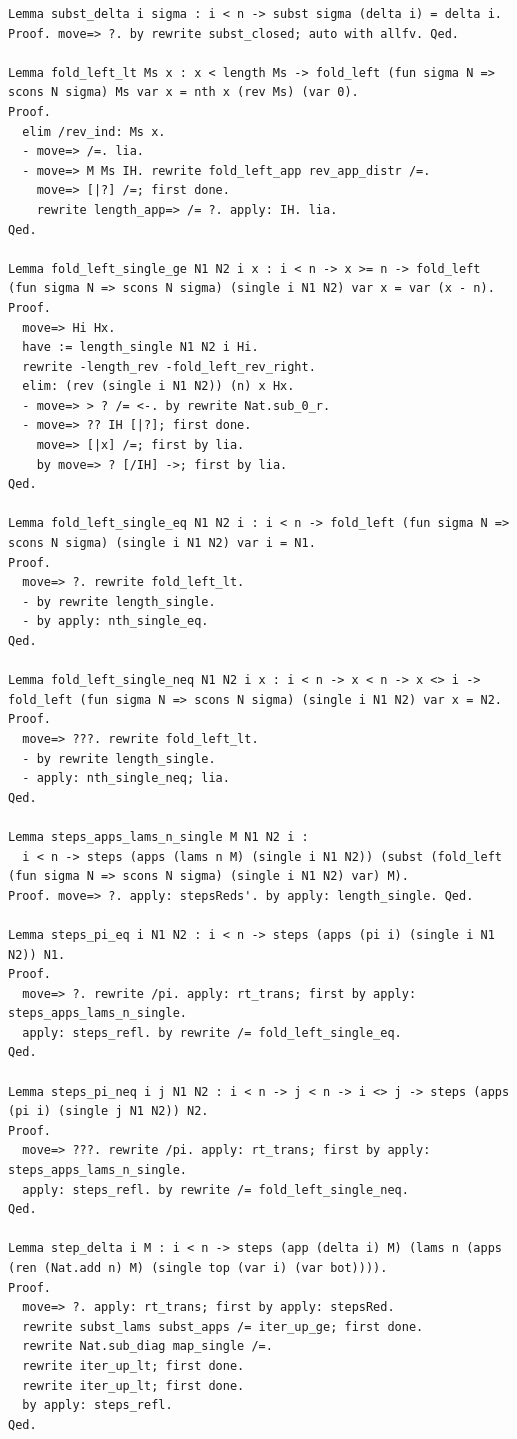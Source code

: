 \begin{lstlisting}
Lemma subst_delta i sigma : i < n -> subst sigma (delta i) = delta i.
Proof. move=> ?. by rewrite subst_closed; auto with allfv. Qed.

Lemma fold_left_lt Ms x : x < length Ms -> fold_left (fun sigma N => scons N sigma) Ms var x = nth x (rev Ms) (var 0).
Proof.
  elim /rev_ind: Ms x.
  - move=> /=. lia.
  - move=> M Ms IH. rewrite fold_left_app rev_app_distr /=.
    move=> [|?] /=; first done.
    rewrite length_app=> /= ?. apply: IH. lia.
Qed.

Lemma fold_left_single_ge N1 N2 i x : i < n -> x >= n -> fold_left (fun sigma N => scons N sigma) (single i N1 N2) var x = var (x - n).
Proof.
  move=> Hi Hx.
  have := length_single N1 N2 i Hi.
  rewrite -length_rev -fold_left_rev_right.
  elim: (rev (single i N1 N2)) (n) x Hx.
  - move=> > ? /= <-. by rewrite Nat.sub_0_r.
  - move=> ?? IH [|?]; first done.
    move=> [|x] /=; first by lia.
    by move=> ? [/IH] ->; first by lia.
Qed.

Lemma fold_left_single_eq N1 N2 i : i < n -> fold_left (fun sigma N => scons N sigma) (single i N1 N2) var i = N1.
Proof.
  move=> ?. rewrite fold_left_lt.
  - by rewrite length_single.
  - by apply: nth_single_eq.
Qed.

Lemma fold_left_single_neq N1 N2 i x : i < n -> x < n -> x <> i -> fold_left (fun sigma N => scons N sigma) (single i N1 N2) var x = N2.
Proof.
  move=> ???. rewrite fold_left_lt.
  - by rewrite length_single.
  - apply: nth_single_neq; lia.
Qed.

Lemma steps_apps_lams_n_single M N1 N2 i :
  i < n -> steps (apps (lams n M) (single i N1 N2)) (subst (fold_left (fun sigma N => scons N sigma) (single i N1 N2) var) M).
Proof. move=> ?. apply: stepsReds'. by apply: length_single. Qed.

Lemma steps_pi_eq i N1 N2 : i < n -> steps (apps (pi i) (single i N1 N2)) N1.
Proof.
  move=> ?. rewrite /pi. apply: rt_trans; first by apply: steps_apps_lams_n_single.
  apply: steps_refl. by rewrite /= fold_left_single_eq.
Qed.

Lemma steps_pi_neq i j N1 N2 : i < n -> j < n -> i <> j -> steps (apps (pi i) (single j N1 N2)) N2.
Proof.
  move=> ???. rewrite /pi. apply: rt_trans; first by apply: steps_apps_lams_n_single.
  apply: steps_refl. by rewrite /= fold_left_single_neq.
Qed.

Lemma step_delta i M : i < n -> steps (app (delta i) M) (lams n (apps (ren (Nat.add n) M) (single top (var i) (var bot)))).
Proof.
  move=> ?. apply: rt_trans; first by apply: stepsRed.
  rewrite subst_lams subst_apps /= iter_up_ge; first done.
  rewrite Nat.sub_diag map_single /=.
  rewrite iter_up_lt; first done.
  rewrite iter_up_lt; first done.
  by apply: steps_refl.
Qed.


\end{lstlisting}
